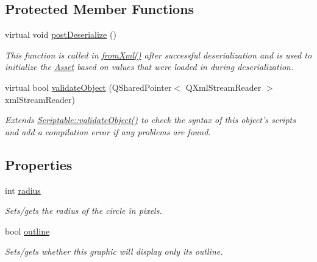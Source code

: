 \subsection*{Protected Member Functions}
\begin{DoxyCompactItemize}
\item 
virtual void \hyperlink{class_picto_1_1_circle_graphic_a1e8bbb263c5da6cf68d4575f603c1fe6}{post\-Deserialize} ()
\begin{DoxyCompactList}\small\item\em This function is called in \hyperlink{class_picto_1_1_asset_a8bed4da09ecb1c07ce0dab313a9aba67}{from\-Xml()} after successful deserialization and is used to initialize the \hyperlink{class_picto_1_1_asset}{Asset} based on values that were loaded in during deserialization. \end{DoxyCompactList}\item 
\hypertarget{class_picto_1_1_circle_graphic_a0954a798467ec7f98d66c400813ce1cb}{virtual bool \hyperlink{class_picto_1_1_circle_graphic_a0954a798467ec7f98d66c400813ce1cb}{validate\-Object} (Q\-Shared\-Pointer$<$ Q\-Xml\-Stream\-Reader $>$ xml\-Stream\-Reader)}\label{class_picto_1_1_circle_graphic_a0954a798467ec7f98d66c400813ce1cb}

\begin{DoxyCompactList}\small\item\em Extends \hyperlink{class_picto_1_1_scriptable_ab6e2944c43a3b5d418bf7b251594386d}{Scriptable\-::validate\-Object()} to check the syntax of this object's scripts and add a compilation error if any problems are found. \end{DoxyCompactList}\end{DoxyCompactItemize}
\subsection*{Properties}
\begin{DoxyCompactItemize}
\item 
\hypertarget{class_picto_1_1_circle_graphic_a574ae580b977bfec39184f209f816cab}{int \hyperlink{class_picto_1_1_circle_graphic_a574ae580b977bfec39184f209f816cab}{radius}}\label{class_picto_1_1_circle_graphic_a574ae580b977bfec39184f209f816cab}

\begin{DoxyCompactList}\small\item\em Sets/gets the radius of the circle in pixels. \end{DoxyCompactList}\item 
\hypertarget{class_picto_1_1_circle_graphic_ac94afcac35d083f3894161b680eb4003}{bool \hyperlink{class_picto_1_1_circle_graphic_ac94afcac35d083f3894161b680eb4003}{outline}}\label{class_picto_1_1_circle_graphic_ac94afcac35d083f3894161b680eb4003}

\begin{DoxyCompactList}\small\item\em Sets/gets whether this graphic will display only its outline. \end{DoxyCompactList}\end{DoxyCompactItemize}

